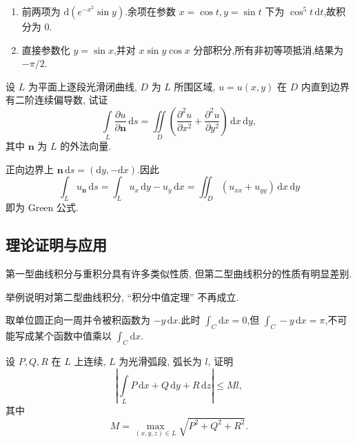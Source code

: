 \begin{solution}
    \leavevmode
    \begin{enumerate}
        \item 前两项为 $\mathrm{d}(e^{-x^2}\sin y)$.余项在参数 $x=\cos t,y=\sin t$ 下为 $\cos^5t\,\mathrm{d}t$,故积分为 $0$.
        \item 直接参数化 $y=\sin x$,并对 $x\sin y\cos x$ 分部积分,所有非初等项抵消,结果为 $-\pi/2$.
    \end{enumerate}
\end{solution}

\begin{example}
    设 $L$ 为平面上逐段光滑闭曲线, $D$ 为 $L$ 所围区域, $u=u(x,y)$ 在 $D$ 内直到边界有二阶连续偏导数, 试证
    \[
        \displaystyle\int\limits_L\dfrac{\partial u}{\partial\bm n}\,\mathrm{d}s
        =\iint\limits_D\left(\dfrac{\partial^2u}{\partial x^2}+\dfrac{\partial^2u}{\partial y^2}\right)\,\mathrm{d}x\,\mathrm{d}y,
    \]
    其中 $\bm n$ 为 $L$ 的外法向量.
\end{example}
\exampleblank

\begin{solution}
    正向边界上 $\bm n\,\mathrm{d}s=(\mathrm{d}y,-\mathrm{d}x)$.因此
    \[
        \displaystyle\int_Lu_{\bm n}\,\mathrm{d}s=\int_Lu_x\,\mathrm{d}y-u_y\,\mathrm{d}x
        =\iint_D(u_{xx}+u_{yy})\,\mathrm{d}x\,\mathrm{d}y
    \]
    即为 Green 公式.
\end{solution}



\subsection{理论证明与应用}

第一型曲线积分与重积分具有许多类似性质, 但第二型曲线积分的性质有明显差别.

\begin{example}
    举例说明对第二型曲线积分, ``积分中值定理'' 不再成立.
\end{example}
\exampleblank

\begin{solution}
    取单位圆正向一周并令被积函数为 $-y\,\mathrm{d}x$.此时 $\displaystyle\int_C\mathrm{d}x=0$,但 $\displaystyle\int_C-y\,\mathrm{d}x=\pi$,不可能写成某个函数中值乘以 $\displaystyle\int_C\mathrm{d}x$.
\end{solution}

\begin{example}
    设 $P,Q,R$ 在 $L$ 上连续, $L$ 为光滑弧段, 弧长为 $l$, 证明
    \[
        \left|\int\limits_LP\,\mathrm{d}x+Q\,\mathrm{d}y+R\,\mathrm{d}z\right|\leq Ml,
    \]
    其中
    \[
        M=\max_{(x,y,z)\in L}\sqrt{P^2+Q^2+R^2}.
    \]
\end{example}
\exampleblank

